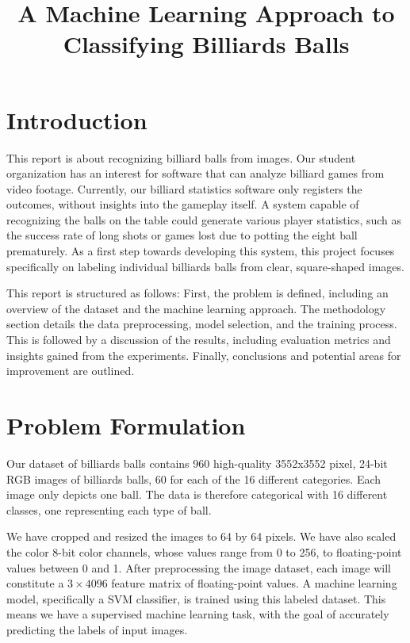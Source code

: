 \documentclass{article}
\begin{document}

\title{A Machine Learning Approach to Classifying Billiards Balls}
\maketitle

\section{Introduction}
This report is about recognizing billiard balls from images. Our student organization has an interest for software that can analyze billiard games from video footage. Currently, our billiard statistics software only registers the outcomes, without insights into the gameplay itself. A system capable of recognizing the balls on the table could generate various player statistics, such as the success rate of long shots or games lost due to potting the eight ball prematurely. As a first step towards developing this system, this project focuses specifically on labeling individual billiards balls from clear, square-shaped images.

This report is structured as follows: First, the problem is defined, including an overview of the dataset and the machine learning approach. The methodology section details the data preprocessing, model selection, and the training process. This is followed by a discussion of the results, including evaluation metrics and insights gained from the experiments. Finally, conclusions and potential areas for improvement are outlined.



\section{Problem Formulation}
\label{sec:problem_formulation}
Our dataset of billiards balls contains 960 high-quality 3552x3552 pixel, 24-bit RGB images of billiards balls, 60 for each of the 16 different categories. Each image only depicts one ball. The data is therefore categorical with 16 different classes, one representing each type of ball.

We have cropped and resized the images to 64 by 64 pixels. We have also scaled the color 8-bit color channels, whose values range from 0 to 256, to floating-point values between 0 and 1. After preprocessing the image dataset, each image will constitute a $3\times 4096$ feature matrix of floating-point values. A machine learning model, specifically a SVM classifier, is trained using this labeled dataset. This means we have a supervised machine learning task, with the goal of accurately predicting the labels of input images. 
\end{document}
